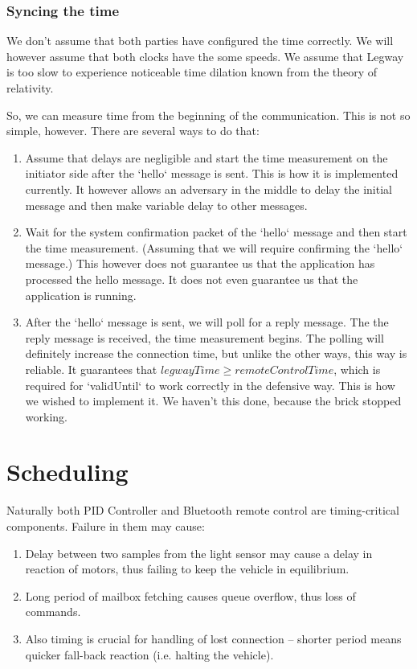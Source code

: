 \documentclass{article}
\begin{document}
\subsubsection{Syncing the time}
We don't assume that both parties have configured the time correctly. We will however assume that both clocks have the some speeds. We assume that Legway is too slow to experience noticeable time dilation known from the theory of relativity. 

So, we can measure time from the beginning of the communication. This is not so simple, however. There are several ways to do that:

\begin{enumerate}
\item Assume that delays are negligible and start the time measurement on the initiator side after the `hello` message is sent. This is how it is implemented currently. It however allows an adversary in the middle to delay the initial message and then make variable delay to other messages.
\item Wait for the system confirmation packet of the `hello` message and then start the time measurement. (Assuming that we will require confirming the `hello` message.) This however does not guarantee us that the application has processed the hello message. It does not even guarantee us that the application is running.
\item After the `hello` message is sent, we will poll for a reply message. The the reply message is received, the time measurement begins. The polling will definitely increase the connection time, but unlike the other ways, this way is reliable. It guarantees that $legwayTime \geq remoteControlTime$, which is required for `validUntil` to work correctly in the defensive way. This is how we wished to implement it. We haven't this done, because the brick stopped working.
\end{enumerate}

\section{Scheduling}

Naturally both PID Controller and Bluetooth remote control are timing-critical components. Failure in them may cause:

\begin{enumerate}
\item Delay between two samples from the light sensor may cause a delay in reaction of motors, thus failing to keep the vehicle in equilibrium.
\item Long period of mailbox fetching causes queue overflow, thus loss of commands.
\item Also timing is crucial for handling of lost connection -- shorter period means quicker fall-back reaction (i.e. halting the vehicle).
\end{enumerate}
\end{document}

